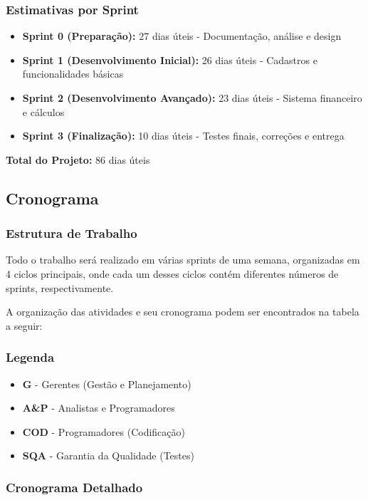 \subsubsection{Estimativas por Sprint}
\begin{itemize}
    \item \textbf{Sprint 0 (Preparação):} 27 dias úteis - Documentação, análise e design
    \item \textbf{Sprint 1 (Desenvolvimento Inicial):} 26 dias úteis - Cadastros e funcionalidades básicas
    \item \textbf{Sprint 2 (Desenvolvimento Avançado):} 23 dias úteis - Sistema financeiro e cálculos
    \item \textbf{Sprint 3 (Finalização):} 10 dias úteis - Testes finais, correções e entrega
\end{itemize}

\textbf{Total do Projeto:} 86 dias úteis

\subsection{Cronograma}

\subsubsection{Estrutura de Trabalho}
Todo o trabalho será realizado em várias sprints de uma semana, organizadas em 4 ciclos principais, onde cada um desses ciclos contém diferentes números de sprints, respectivamente.

A organização das atividades e seu cronograma podem ser encontrados na tabela a seguir:

\subsubsection{Legenda}
\begin{itemize}
    \item \textbf{G} - Gerentes (Gestão e Planejamento)
    \item \textbf{A\&P} - Analistas e Programadores
    \item \textbf{COD} - Programadores (Codificação)
    \item \textbf{SQA} - Garantia da Qualidade (Testes)
\end{itemize}

\subsubsection{Cronograma Detalhado}

